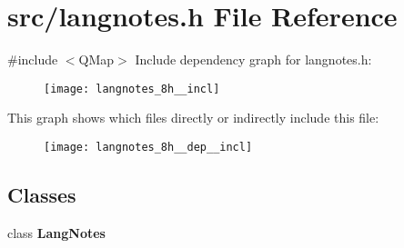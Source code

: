 \section{src/langnotes.h File Reference}
\label{langnotes_8h}
{\ttfamily \#include $<$Q\+Map$>$}\newline
Include dependency graph for langnotes.\+h\+:\nopagebreak
\begin{figure}[H]
\begin{center}
\leavevmode
\texttt{[image: langnotes\_8h\_\_incl]}
\end{center}
\end{figure}
This graph shows which files directly or indirectly include this file\+:
\nopagebreak
\begin{figure}[H]
\begin{center}
\leavevmode
\texttt{[image: langnotes\_8h\_\_dep\_\_incl]}
\end{center}
\end{figure}
\subsection*{Classes}
\begin{DoxyCompactItemize}
\item 
class \textbf{ Lang\+Notes}
\end{DoxyCompactItemize}
